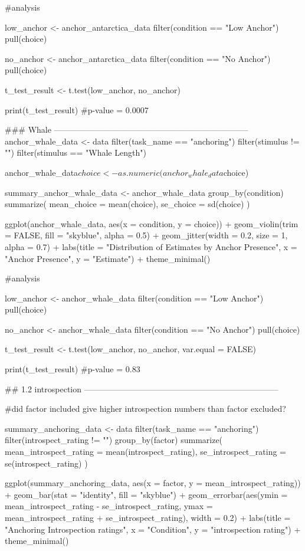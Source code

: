 \documentclass{article}
\begin{document}
#analysis

low_anchor <- anchor_antarctica_data %
  filter(condition == "Low Anchor") %
  pull(choice)

no_anchor <- anchor_antarctica_data %
  filter(condition == "No Anchor") %
  pull(choice)

t_test_result <- t.test(low_anchor, no_anchor)

print(t_test_result)
#p-value = 0.0007


    ### Whale -----------------------------------------------------------------------
anchor_whale_data <- data %
  filter(task_name == "anchoring") %
  filter(stimulus != "") %
  filter(stimulus == "Whale Length")
  
anchor_whale_data$choice <- as.numeric(anchor_whale_data$choice)

summary_anchor_whale_data <- anchor_whale_data %
  group_by(condition) %
  summarize(
    mean_choice = mean(choice),
    se_choice = sd(choice)
  )


ggplot(anchor_whale_data, aes(x = condition, y = choice)) +
  geom_violin(trim = FALSE, fill = "skyblue", alpha = 0.5) +
  geom_jitter(width = 0.2, size = 1, alpha = 0.7) +
  labs(title = "Distribution of Estimates by Anchor Presence", x = "Anchor Presence", y = "Estimate") +
  theme_minimal()

#analysis

low_anchor <- anchor_whale_data %
  filter(condition == "Low Anchor") %
  pull(choice)

no_anchor <- anchor_whale_data %
  filter(condition == "No Anchor") %
  pull(choice)

t_test_result <- t.test(low_anchor, no_anchor, var.equal = FALSE)

print(t_test_result)
#p-value = 0.83

    ## 1.2 introspection -----------------------------------------------------------------------

#did factor included give higher introspection numbers than factor excluded?

summary_anchoring_data <- data %
  filter(task_name == "anchoring") %
  filter(introspect_rating != "") %
  group_by(factor) %
  summarize(
    mean_introspect_rating = mean(introspect_rating),
    se_introspect_rating = se(introspect_rating)
  )

ggplot(summary_anchoring_data, aes(x = factor, y = mean_introspect_rating)) +
  geom_bar(stat = "identity", fill = "skyblue") +
  geom_errorbar(aes(ymin = mean_introspect_rating - se_introspect_rating, ymax = mean_introspect_rating + se_introspect_rating), width = 0.2) +
  labs(title = "Anchoring Introspection ratings", x = "Condition", y = "introspection rating") +
  theme_minimal()
\end{document}
